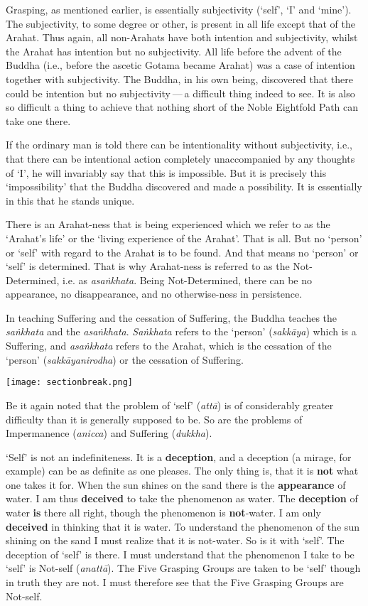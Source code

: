 Grasping, as mentioned earlier, is essentially subjectivity (`self', `I' and `mine'). The subjectivity, to some degree or other, is present in all life except that of the Arahat. Thus again, all non-Arahats have both intention and subjectivity, whilst the Arahat has intention but no subjectivity. All life before the advent of the Buddha (i.e., before the ascetic Gotama became Arahat) was a case of intention together with subjectivity. The Buddha, in his own being, discovered that there could be intention but no subjectivity --- a difficult thing indeed to see. It is also so difficult a thing to achieve that nothing short of the Noble Eightfold Path can take one there.

If the ordinary man is told there can be intentionality without subjectivity, i.e., that there can be intentional action completely unaccompanied by any thoughts of `I', he will invariably say that this is impossible. But it is precisely this `impossibility' that the Buddha discovered and made a possibility. It is essentially in this that he stands unique.

There is an Arahat-ness that is being experienced which we refer to as the `Arahat's life' or the `living experience of the Arahat'. That is all. But no `person' or `self' with regard to the Arahat is to be found. And that means no `person' or `self' is determined. That is why Arahat-ness is referred to as the Not-Determined, i.e. as \emph{asaṅkhata}. Being Not-Determined, there can be no appearance, no disappearance, and no otherwise-ness in persistence.

In teaching Suffering and the cessation of Suffering, the Buddha teaches the \emph{saṅkhata} and the \emph{asaṅkhata}. \emph{Saṅkhata} refers to the `person' (\emph{sakkāya}) which is a Suffering, and \emph{asaṅkhata} refers to the Arahat, which is the cessation of the `person' (\emph{sakkāyanirodha}) or the cessation of Suffering.

\texttt{[image: sectionbreak.png]}

Be it again noted that the problem of `self' (\emph{attā}) is of considerably greater difficulty than it is generally supposed to be. So are the problems of Impermanence (\emph{anicca}) and Suffering (\emph{dukkha}).

`Self' is not an indefiniteness. It is a \textbf{deception}, and a deception (a mirage, for example) can be as definite as one pleases. The only thing is, that it is \textbf{not} what one takes it for. When the sun shines on the sand there is the \textbf{appearance} of water. I am thus \textbf{deceived} to take the phenomenon as water. The \textbf{deception} of water \textbf{is} there all right, though the phenomenon is \textbf{not}-water. I am only \textbf{deceived} in thinking that it is water. To understand the phenomenon of the sun shining on the sand I must realize that it is not-water. So is it with `self'. The deception of `self' is there. I must understand that the phenomenon I take to be `self' is Not-self (\emph{anattā}). The Five Grasping Groups are taken to be `self' though in truth they are not. I must therefore see that the Five Grasping Groups are Not-self.

